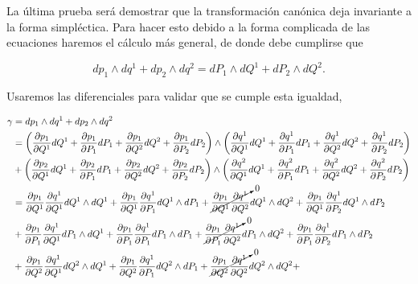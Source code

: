 \documentclass[a4paper,10pt]{article}
\numberwithin{equation}{section}
\begin{document}
La última prueba será demostrar que la transformación canónica deja invariante 
a la forma simpléctica. Para hacer esto debido a la forma complicada de las ecuaciones 
haremos el cálculo más general, de donde debe cumplirse que 

\begin{equation}
 dp_1 \wedge dq^1 + dp_2 \wedge dq^2 = dP_1 \wedge dQ^1 + dP_2 \wedge dQ^2.
\end{equation}

Usaremos las diferenciales para validar que se cumple esta igualdad,

\begin{align*}
 \gamma &= dp_1 \wedge dq^1 + dp_2 \wedge dq^2 \\
 &= \left(\frac{\partial p_1}{\partial Q^1}dQ^1 + \frac{\partial p_1}{\partial P_1}dP_1 + 
 \frac{\partial p_1}{\partial Q^2}dQ^2 + \frac{\partial p_1}{\partial P_2}dP_2 \right) 
 \wedge \left(\frac{\partial q^1}{\partial Q^1}dQ^1 + \frac{\partial q^1}{\partial P_1}dP_1 + 
 \frac{\partial q^1}{\partial Q^2}dQ^2 + \frac{\partial q^1}{\partial P_2}dP_2 \right) \\
 &+ \left(\frac{\partial p_2}{\partial Q^1}dQ^1 + \frac{\partial p_2}{\partial P_1}dP_1 + 
 \frac{\partial p_2}{\partial Q^2}dQ^2 + \frac{\partial p_2}{\partial P_2}dP_2 \right) 
 \wedge \left(\frac{\partial q^2}{\partial Q^1}dQ^1 + \frac{\partial q^2}{\partial P_1}dP_1 + 
 \frac{\partial q^2}{\partial Q^2}dQ^2 + \frac{\partial q^2}{\partial P_2}dP_2 \right) \\
 &= \frac{\partial p_1}{\partial Q^1}\frac{\partial q^1}{\partial Q^1}dQ^1 \wedge dQ^1 + 
 \frac{\partial p_1}{\partial Q^1}\frac{\partial q^1}{\partial P_1}dQ^1 \wedge dP_1 + 
 \cancelto{0}{\frac{\partial p_1}{\partial Q^1}\frac{\partial q^1}{\partial Q^2}}dQ^1 \wedge dQ^2 + 
 \frac{\partial p_1}{\partial Q^1}\frac{\partial q^1}{\partial P_2}dQ^1 \wedge dP_2 \\
 &+ \frac{\partial p_1}{\partial P_1}\frac{\partial q^1}{\partial Q^1} dP_1 \wedge dQ^1 +
 \frac{\partial p_1}{\partial P_1}\frac{\partial q^1}{\partial P_1} dP_1 \wedge dP_1 + 
 \cancelto{0}{\frac{\partial p_1}{\partial P_1}\frac{\partial q^1}{\partial Q^2}} dP_1 \wedge dQ^2 + 
 \frac{\partial p_1}{\partial P_1}\frac{\partial q^1}{\partial P_2} dP_1 \wedge dP_2 \\
 &+  \frac{\partial p_1}{\partial Q^2}\frac{\partial q^1}{\partial Q^1} dQ^2 \wedge dQ^1 
 + \frac{\partial p_1}{\partial Q^2}\frac{\partial q^1}{\partial P_1} dQ^2 \wedge dP_1 + 
 \cancelto{0}{\frac{\partial p_1}{\partial Q^2}\frac{\partial q^1}{\partial Q^2}} dQ^2 \wedge dQ^2 + 

\end{align*}
\end{document}
